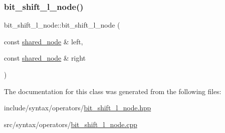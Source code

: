 \subsubsection{\texorpdfstring{bit\+\_\+shift\+\_\+l\+\_\+node()}{bit\_shift\_l\_node()}}
{\footnotesize\ttfamily bit\+\_\+shift\+\_\+l\+\_\+node\+::bit\+\_\+shift\+\_\+l\+\_\+node (\begin{DoxyParamCaption}\item[{const \hyperlink{namespacejawe_a3f307481d921b6cbb50cc8511fc2b544}{shared\+\_\+node} \&}]{left,  }\item[{const \hyperlink{namespacejawe_a3f307481d921b6cbb50cc8511fc2b544}{shared\+\_\+node} \&}]{right }\end{DoxyParamCaption})}



The documentation for this class was generated from the following files\+:\begin{DoxyCompactItemize}
\item 
include/syntax/operators/\hyperlink{bit__shift__l__node_8hpp}{bit\+\_\+shift\+\_\+l\+\_\+node.\+hpp}\item 
src/syntax/operators/\hyperlink{bit__shift__l__node_8cpp}{bit\+\_\+shift\+\_\+l\+\_\+node.\+cpp}\end{DoxyCompactItemize}
